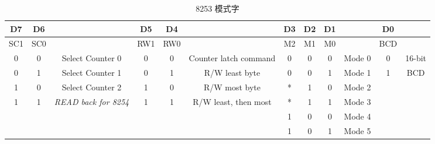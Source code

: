 \begin{table*}
\centering
\caption{8253 模式字}
\begin{tabular}{|c|c|c||c|c|c||c|c|c|c||c|c|}
	\hline
	D7 & D6 & & D5 & D4 & & D3 & D2 & D1 & & D0 & \\
	\hline
	SC1 & SC0 &  & RW1 & RW0 &  & M2 & M1 & M0 &  & BCD &  \\
	\hline
	0 & 0 & Select Counter 0 & 0 & 0 & Counter latch command & 0 & 0 & 0 & Mode 0 & 0 & 16-bit \\
	\hline
	0 & 1 & Select Counter 1 & 0 & 1 & R/W least byte & 0 & 0 & 1 & Mode 1 & 1 & BCD \\
	\hline
	1 & 0 & Select Counter 2 & 1 & 0 & R/W most byte & * & 1 & 0 & Mode 2 &  &  \\
	\hline
	1 & 1 & \textit{READ back for 8254 }& 1 & 1 & R/W least, then most & * & 1  & 1 & Mode 3 &  &  \\
	\hline
	&  &  &  &  &  & 1 & 0 & 0 & Mode 4 &  &  \\
	\hline
	&  &  &  &  &  & 1 & 0 & 1 & Mode 5 &  &  \\
	\hline
\end{tabular}
\end{table*}

